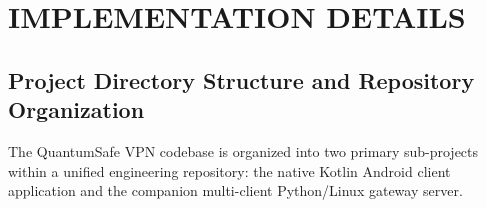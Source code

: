 
\chapter{IMPLEMENTATION DETAILS}
\label{chap:implementation}

\section{Project Directory Structure and Repository Organization}
\label{sec:directory_structure}

The QuantumSafe VPN codebase is organized into two primary sub-projects within a unified engineering repository: the native Kotlin Android client application and the companion multi-client Python/Linux gateway server.

